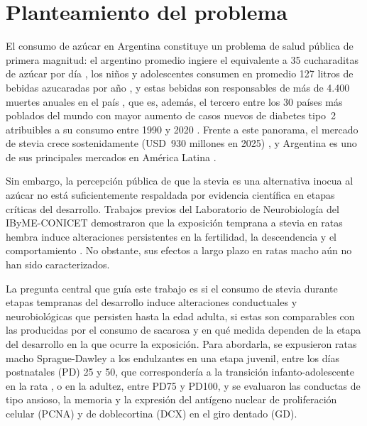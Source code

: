 \section{Planteamiento del problema}\label{sec:planteamiento}

El consumo de azúcar en Argentina constituye un problema de salud pública de primera magnitud: el argentino promedio ingiere el equivalente a 35 cucharaditas de azúcar por día \cite{fad2026bebidas}, los niños y adolescentes consumen en promedio 127 litros de bebidas azucaradas por año \cite{ennys2019}, y estas bebidas son responsables de más de 4.400 muertes anuales en el país \cite{alcaraz2023ssb}, que es, además, el tercero entre los 30 países más poblados del mundo con mayor aumento de casos nuevos de diabetes tipo~2 atribuibles a su consumo entre 1990 y 2020 \cite{laracastor2025ssb}. Frente a este panorama, el mercado de stevia crece sostenidamente (USD~930 millones en 2025) \cite{mordor2024stevia}, y Argentina es uno de sus principales mercados en América Latina \cite{ie2025latam,ie2025argentina}.

Sin embargo, la percepción pública de que la stevia es una alternativa inocua al azúcar no está suficientemente respaldada por evidencia científica en etapas críticas del desarrollo. Trabajos previos del Laboratorio de Neurobiología del IByME-CONICET demostraron que la exposición temprana a stevia en ratas hembra induce alteraciones persistentes en la fertilidad, la descendencia y el comportamiento \cite{kruse2025stevia}. No obstante, sus efectos a largo plazo en ratas macho aún no han sido caracterizados.

La pregunta central que guía este trabajo es si el consumo de stevia durante etapas tempranas del desarrollo induce alteraciones conductuales y neurobiológicas que persisten hasta la edad adulta, si estas son comparables con las producidas por el consumo de sacarosa y en qué medida dependen de la etapa del desarrollo en la que ocurre la exposición. Para abordarla, se expusieron ratas macho Sprague-Dawley a los endulzantes en una etapa juvenil, entre los días postnatales (PD) 25 y 50, que correspondería a la transición infanto-adolescente en la rata \cite{spear2000adolescent}, o en la adultez, entre PD75 y PD100, y se evaluaron las conductas de tipo ansioso, la memoria y la expresión del antígeno nuclear de proliferación celular (PCNA) y de doblecortina (DCX) en el giro dentado (GD).

